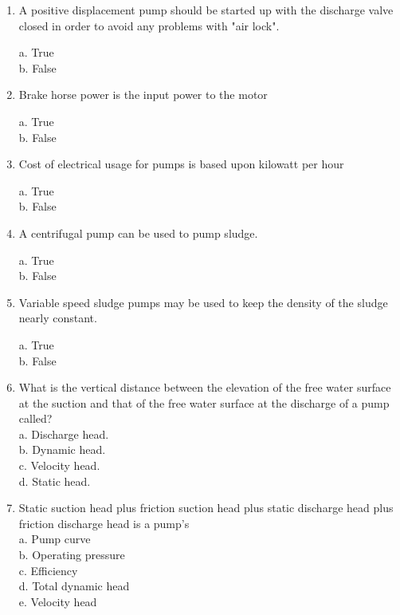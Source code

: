\newpage
\begin{tcolorbox}[breakable, enhanced,
colframe=blue!25,
colback=blue!10,
coltitle=blue!20!black,  
title= Chapter Assessment]

\begin{enumerate}
\item  A positive displacement pump should be started up with the discharge valve closed in order to avoid any problems with "air lock". 

a. True \\
b. False 


\item  Brake horse power is the input power to the motor 

a. True \\
b. False 


\item  Cost of electrical usage for pumps is based upon kilowatt per hour 

a. True \\
b. False 


\item  A centrifugal pump can be used to pump sludge. 

a. True \\
b. False 


\item  Variable speed sludge pumps may be used to keep the density of the sludge nearly constant. 

a. True \\
b. False

\item  What is the vertical distance between the elevation of the free water surface at the suction and that of the free water surface at the discharge of a pump called?\\
a.  Discharge head.\\
b.  Dynamic head.\\
c.  Velocity head.\\
d. Static head.\\

\item Static suction head plus friction suction head plus static discharge head plus friction discharge head is a pump's\\
a. Pump curve\\
b. Operating pressure\\
c. Efficiency\\
d. Total dynamic head\\
e. Velocity head\\

\end{enumerate}
\end{tcolorbox}